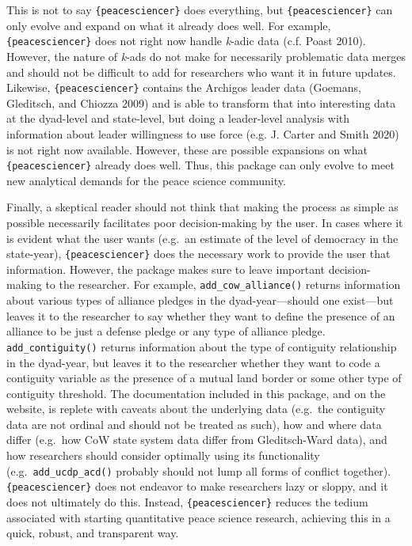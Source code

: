 \documentclass[
  11pt,
]{article}
\begin{document}
This is not to say \texttt{\{peacesciencer\}} does everything, but \texttt{\{peacesciencer\}} can only evolve and expand on what it already does well. For example, \texttt{\{peacesciencer\}} does not right now handle \emph{k}-adic data (c.f. Poast 2010). However, the nature of \emph{k}-ads do not make for necessarily problematic data merges and should not be difficult to add for researchers who want it in future updates. Likewise, \texttt{\{peacesciencer\}} contains the Archigos leader data (Goemans, Gleditsch, and Chiozza 2009) and is able to transform that into interesting data at the dyad-level and state-level, but doing a leader-level analysis with information about leader willingness to use force (e.g. J. Carter and Smith 2020) is not right now available. However, these are possible expansions on what \texttt{\{peacesciencer\}} already does well. Thus, this package can only evolve to meet new analytical demands for the peace science community.

Finally, a skeptical reader should not think that making the process as simple as possible necessarily facilitates poor decision-making by the user. In cases where it is evident what the user wants (e.g.~an estimate of the level of democracy in the state-year), \texttt{\{peacesciencer\}} does the necessary work to provide the user that information. However, the package makes sure to leave important decision-making to the researcher. For example, \texttt{add\_cow\_alliance()} returns information about various types of alliance pledges in the dyad-year---should one exist---but leaves it to the researcher to say whether they want to define the presence of an alliance to be just a defense pledge or any type of alliance pledge. \texttt{add\_contiguity()} returns information about the type of contiguity relationship in the dyad-year, but leaves it to the researcher whether they want to code a contiguity variable as the presence of a mutual land border or some other type of contiguity threshold. The documentation included in this package, and on the website, is replete with caveats about the underlying data (e.g.~the contiguity data are not ordinal and should not be treated as such), how and where data differ (e.g.~how CoW state system data differ from Gleditsch-Ward data), and how researchers should consider optimally using its functionality (e.g.~\texttt{add\_ucdp\_acd()} probably should not lump all forms of conflict together). \texttt{\{peacesciencer\}} does not endeavor to make researchers lazy or sloppy, and it does not ultimately do this. Instead, \texttt{\{peacesciencer\}} reduces the tedium associated with starting quantitative peace science research, achieving this in a quick, robust, and transparent way.
\end{document}
